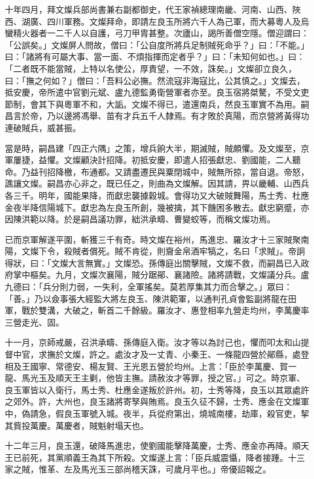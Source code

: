\begin{pinyinscope}
十年四月，拜文燦兵部尚書兼右副都御史，代王家禎總理南畿、河南、山西、陜西、湖廣、四川軍務。文燦拜命，即請左良玉所將六千人為己軍，而大募粵人及烏蠻精火器者一二千人以自護，弓刀甲胄甚整。次廬山，謁所善僧空隱。僧迎謂曰：「公誤矣。」文燦屏人問故，僧曰：「公自度所將兵足制賊死命乎？」曰：「不能。」曰：「諸將有可屬大事、當一面、不煩指揮而定者乎？」曰：「未知何如也。」曰：「二者既不能當賊，上特以名使公，厚責望，一不效，誅矣。」文燦卻立良久，曰：「撫之何如？」僧曰：「吾料公必撫。然流寇非海寇比，公其慎之。」文燦去，抵安慶，帝所遣中官劉元斌、盧九德監勇衛營軍者亦至。良玉宿將桀驁，不受文吏節制，會其下與粵軍不和，大詬。文燦不得已，遣還南兵，然良玉軍實不為用。嗣昌言於帝，乃以邊將馮舉、苗有才兵五千人隸焉。有才敗於真陽，而京營將黃得功連破賊兵，威甚振。

當是時，嗣昌建「四正六隅」之策，增兵餉大半，期滅賊，賊頗懼。及文燦至，京軍屢捷，益懼。文燦顧決計招降。初抵安慶，即遣人招張獻忠、劉國能，二人聽命。乃益刊招降檄，布通都。又請盡遷民與粟閉城中，賊無所掠，當自退。帝怒，譙讓文燦。嗣昌亦心非之，既已任之，則曲為文燦解。因其請，畀以畿輔、山西兵各三千。明年，國能果降，而獻忠襲據穀城。會得功又大破賊舞陽，馬士秀、杜應金夜半降信陽城下。獻忠為左良玉所創，幾被擒，其下饑困多散去。獻忠窮蹙，亦因陳洪範以降。於是嗣昌議功罪，絀洪承疇、曹變蛟等，而稱文燦功焉。

已而京軍解遂平圍，斬獲三千有奇。時文燦在裕州，馬進忠、羅汝才十三家賊聚南陽，文燦下令，殺賊者償死。賊不肯從，則齎金帛酒牢犒之，名曰「求賊」。帝詗得狀，曰：「文燦大言無實。」文燦恐。孫傳庭出關擊賊，文燦不救，而嗣昌已入政府掌中樞矣。九月，文燦次襄陽，賊分踞鄖、襄諸險。諸將請戰，文燦議分兵。盧九德曰：「兵分則力弱，一失利，全軍搖矣。莫若厚集其力而合擊之。」眾曰：「善。」乃以僉事張大經監大將左良玉、陳洪範軍，以通判孔貞會監副將龍在田軍，戰於雙溝，大破之，斬首二千餘級。羅汝才、惠登相率九營走均州，李萬慶率三營走光、固。

十一月，京師戒嚴，召洪承疇、孫傳庭入衛。汝才等以為討己也，懼而叩太和山提督中官，求撫於文燦，許之。處汝才及一丈青、小秦王、一條龍四營於鄖縣，處登相及王國寧、常德安、楊友賢、王光恩五營於均州。上言：「臣於李萬慶、賀一龍、馬光玉及順天王主剿，他皆主撫。請赦汝才等罪，授之官。」可之。時京軍、良玉軍皆以入衛行，馬士秀、杜應金遂叛於許州。初，士秀等降，良玉以其眾處許之郊外。許，大州也，良玉諸將寄孥與賄焉。良玉久征不歸，士秀、應金在文燦軍中，偽請急，假良玉軍號入城。夜半，兵從府第出，燒城南樓，劫庫，殺官吏，挈其貲投萬慶。萬慶者，賊魁射塌天也。

十二年三月，良玉還，破降馬進忠，使劉國能擊降萬慶，士秀、應金亦再降。順天王已前死，其黨順義王為其下所殺。文燦遂上言：「臣兵威震懾，降者接踵。十三家之賊，惟革、左及馬光玉三部尚稽天誅，可歲月平也。」帝優詔報之。


\end{pinyinscope}
